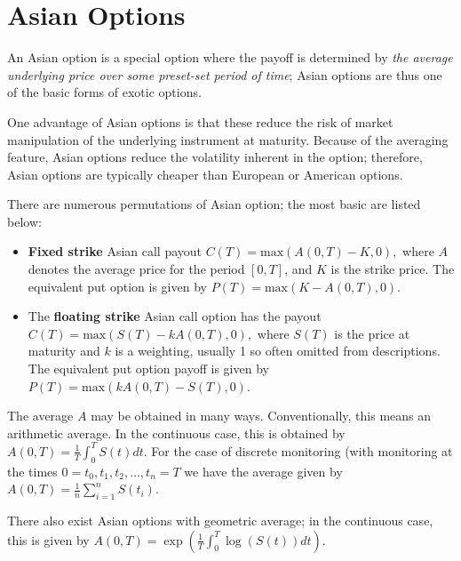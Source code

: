 \section{Asian Options}
\label{sec:asian_option}

An Asian option is a special option where the payoff is determined by \emph{the average underlying price over some preset-set period of time}; 
Asian options are thus one of the basic forms of exotic options. 

One advantage of Asian options is that these reduce the risk of market manipulation of the underlying instrument at maturity.
Because of the averaging feature, Asian options reduce the volatility inherent in the option; therefore, Asian options are typically cheaper than European or American options. 

There are numerous permutations of Asian option; the most basic are listed below:
\begin{itemize}
\item \textbf{Fixed strike} Asian call payout
$C(T)={\text{max}}\left(A(0,T)-K,0\right),$
where $A$ denotes the average price for the period $[0, T]$, and $K$ is the strike price. 
The equivalent put option is given by
$P(T)={\text{max}}\left(K-A(0,T),0\right)$.

\item The \textbf{floating strike} Asian call option has the payout
$C(T)={\text{max}}\left(S(T)-kA(0,T),0\right),$
where $S(T)$ is the price at maturity and $k$ is a weighting, usually 1 so often omitted from descriptions.
The equivalent put option payoff is given by
$P(T)={\text{max}}\left(kA(0,T)-S(T),0\right)$.
\end{itemize}

The average $A$ may be obtained in many ways. Conventionally, this means an arithmetic average. In the continuous case, this is obtained by
$A(0,T)={\frac  {1}{T}}\int _{{0}}^{{T}}S(t)dt$.
For the case of discrete monitoring (with monitoring at the times 
$0=t_{0},t_{1},t_{2},\dots ,t_{n}=T$ we have the average given by
$A(0,T)=\frac{1}{n}\sum_{i=1}^{n}S(t_{i})$.

There also exist Asian options with geometric average; in the continuous case, this is given by
$A(0,T)=\exp \left(\frac{1}{T}\int_0^T \log(S(t))dt\right)$.


